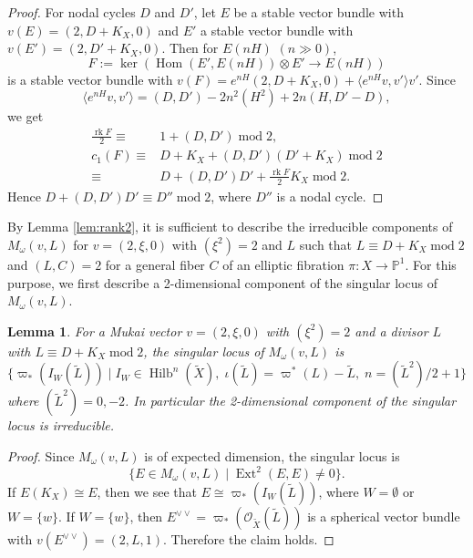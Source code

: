 \documentclass[leqno,11pt]{amsart}
\def\P{\ensuremath{\mathbb{P}}}
\def\Ext{\mathop{\mathrm{Ext}}\nolimits}
\def\Hilb{\mathop{\mathrm{Hilb}}\nolimits}
\def\Hom{\mathop{\mathrm{Hom}}\nolimits}
\def\mod{\mathop{\mathrm{mod}}\nolimits}
\def\rk{\mathop{\mathrm{rk}}}
\newtheorem{Lem}[Thm]{Lemma}
\theoremstyle{definition}
\def\P{\ensuremath{\mathbb{P}}}
\def\OO{\ensuremath{\mathcal O}}
\begin{document}
\begin{proof}
For nodal cycles $D$ and $D'$,
let $E$ be a stable vector bundle with $v(E)=(2,D+K_X,0)$
and
$E'$ a stable vector bundle with $v(E')=(2,D'+K_X,0)$.
Then for $E(nH)$ $(n \gg 0)$,
$$
F:=\ker (\Hom(E',E(nH)) \otimes E' \to E(nH))
$$
is a stable vector bundle
with $v(F)=e^{nH}(2,D+K_X,0)+\langle e^{nH}v,v' \rangle v'$.
Since 
\begin{equation}
\langle e^{nH}v,v' \rangle=(D,D')-2n^2(H^2)+2n(H,D'-D),
\end{equation}
we get
\begin{equation}
\begin{split}
\frac{\rk F}{2} \equiv & 1+(D,D')  \mod 2,\\
c_1(F) \equiv & D+K_X+(D,D')(D'+K_X) \mod 2\\
\equiv &
D+(D,D')D'+\frac{\rk F}{2}K_X \mod 2.
\end{split}
\end{equation}
Hence $D+(D,D')D' \equiv D'' \mod 2$, where $D''$ is a nodal cycle.
\end{proof}






By Lemma \ref{lem:rank2}, it is sufficient to 
describe the irreducible components of $M_\omega(v,L)$
for $v=(2,\xi,0)$ with $(\xi^2)=2$ and $L$ such that 
$L \equiv D +K_X \mod 2$ and $(L,C)=2$
for a general fiber $C$ of an elliptic fibration
$\pi:X \to \P^1$.
For this purpose, we first describe a 2-dimensional component
of the singular locus of $M_\omega(v,L)$.
   
\begin{Lem}\label{ext^2-2}
For a Mukai vector $v=(2,\xi,0)$ with $(\xi^2)=2$ and a divisor $L$
with $L \equiv D+K_X \mod 2$, 
the singular locus of $M_\omega(v,L)$ is
\begin{equation}
\{ \varpi_*(I_W(\widetilde{L})) 
\mid I_W \in \Hilb^n(\widetilde{X}),\; 
\iota(\widetilde{L})=\varpi^*(L)-\widetilde{L},\;
n=(\widetilde{L}^2)/2+1\}
\end{equation}
where $(\widetilde{L}^2)=0,-2$.
In particular the 2-dimensional component of the singular locus is
irreducible.
\end{Lem}


\begin{proof} 
Since $M_\omega(v,L)$ is of expected dimension,
the singular locus is
$$
\{ E \in M_\omega(v,L) \mid \Ext^2(E,E) \ne 0\}.
$$ 
If $E(K_X) \cong E$, then
we see that $E \cong \varpi_*(I_W(\widetilde{L}))$, 
where $W=\emptyset$ or $W=\{w \}$.
If $W=\{w \}$, then 
$E^{\vee \vee}=\varpi_*(\OO_{\widetilde{X}}(\widetilde{L}))$
is a spherical vector bundle with $v(E^{\vee \vee})=(2,L,1)$.
Therefore the claim holds.
\end{proof}
\end{document}
